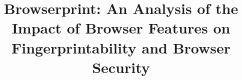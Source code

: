 \documentclass[sigconf, anonymous]{acmart}
\begin{document}
\sloppy
\title{Browserprint: An Analysis of the Impact of Browser Features on Fingerprintability and Browser Security}




\maketitle









\end{document}
